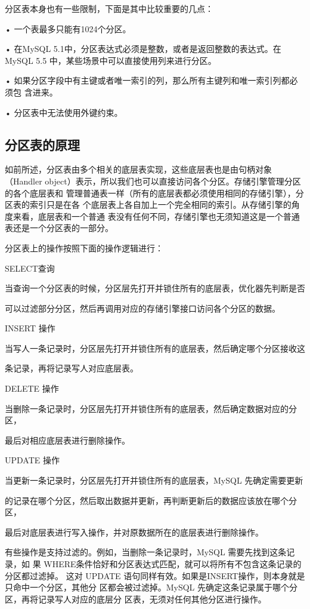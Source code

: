 分区表本身也有一些限制，下面是其中比较重要的几点：

• 一个表最多只能有1024个分区。

• 在MySQL 5.1中，分区表达式必须是整数，或者是返回整数的表达式。在 MySQL 5.5
中，某些场景中可以直接使用列来进行分区。

• 如果分区字段中有主键或者唯一索引的列，那么所有主键列和唯一索引列都必须包
含进来。

• 分区表中无法使用外键约束。

\subsection{分区表的原理}
如前所述，分区表由多个相关的底层表实现，这些底层表也是由句柄对象（Handler
object）表示，所以我们也可以直接访问各个分区。存储引擎管理分区的各个底层表和
管理普通表一样（所有的底层表都必须使用相同的存储引擎），分区表的索引只是在各
个底层表上各自加上一个完全相同的索引。从存储引擎的角度来看，底层表和一个普通
表没有任何不同，存储引擎也无须知道这是一个普通表还是一个分区表的一部分。

分区表上的操作按照下面的操作逻辑进行：

SELECT查询

当查询一个分区表的时候，分区层先打开并锁住所有的底层表，优化器先判断是否

可以过滤部分分区，然后再调用对应的存储引擎接口访问各个分区的数据。

INSERT 操作

当写人一条记录时，分区层先打开并锁住所有的底层表，然后确定哪个分区接收这

条记录，再将记录写人对应底层表。

DELETE 操作

当删除一条记录时，分区层先打开并锁住所有的底层表，然后确定数据对应的分区，

最后对相应底层表进行删除操作。

UPDATE 操作

当更新一条记录时，分区层先打开并锁住所有的底层表，MySQL 先确定需要更新

的记录在哪个分区，然后取出数据并更新，再判断更新后的数据应该放在哪个分区，

最后对底层表进行写入操作，并对原数据所在的底层表进行删除操作。

有些操作是支持过滤的。例如，当删除一条记录时，MySQL 需要先找到这条记录，如
果 WHERE条件恰好和分区表达式匹配，就可以将所有不包含这条记录的分区都过滤掉。
这对 UPDATE 语句同样有效。如果是INSERT操作，则本身就是只命中一个分区，其他分
区都会被过滤掉。MySQL 先确定这条记录属于哪个分区，再将记录写人对应的底层分
区表，无须对任何其他分区进行操作。

